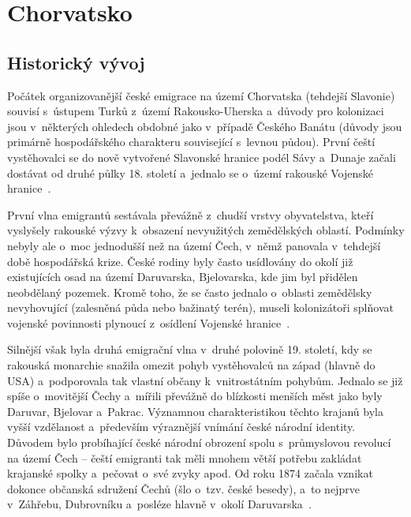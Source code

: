 \hypertarget{chorvatsko}{%
\section{Chorvatsko}\label{chorvatsko}}

\hypertarget{historickuxfd-vuxfdvoj-3}{%
\subsection*{Historický vývoj}\label{historickuxfd-vuxfdvoj-3}}

Počátek organizovanější české emigrace na území Chorvatska (tehdejší Slavonie) souvisí s~ústupem Turků z~území Rakousko-Uherska a~důvody pro kolonizaci jsou v~některých ohledech obdobné jako v~případě Českého Banátu (důvody jsou primárně hospodářského charakteru související s~levnou půdou). První čeští vystěhovalci se do nově vytvořené Slavonské hranice podél Sávy a~Dunaje začali dostávat od druhé půlky 18. století a~jednalo se o~území rakouské Vojenské hranice~\parencite{Preissova2020}.

První vlna emigrantů sestávala převážně z~chudší vrstvy obyvatelstva, kteří vyslyšely rakouské výzvy k~obsazení nevyužitých zemědělských oblastí. Podmínky nebyly ale o~moc jednodušší než na území Čech, v~němž panovala v~tehdejší době hospodářská krize. České rodiny byly často usídlovány do okolí již existujících osad na území Daruvarska, Bjelovarska, kde jim byl přidělen neobdělaný pozemek. Kromě toho, že se často jednalo o~oblasti zemědělsky nevyhovující (zalesněná půda nebo bažinatý terén), museli kolonizátoři splňovat vojenské povinnosti plynoucí z~osídlení Vojenské hranice~\parencite{Stranjik2017}.

Silnější však byla druhá emigrační vlna v~druhé polovině 19. století, kdy se rakouská monarchie snažila omezit pohyb vystěhovalců na západ (hlavně do USA) a~podporovala tak vlastní občany k~vnitrostátním pohybům. Jednalo se již spíše o~movitější Čechy a~mířili převážně do blízkosti menších měst jako byly Daruvar, Bjelovar a~Pakrac. Významnou charakteristikou těchto krajanů byla vyšší vzdělanost a~především výraznější vnímání české národní identity. Důvodem bylo probíhající české národní obrození spolu s~průmyslovou revolucí na území Čech -- čeští emigranti tak měli mnohem větší potřebu zakládat krajanské spolky a~pečovat o~své zvyky apod. Od roku 1874 začala vznikat dokonce občanská sdružení Čechů (šlo o~tzv. české besedy), a~to nejprve v~Záhřebu, Dubrovníku a~posléze hlavně v~okolí Daruvarska~\parencite{Stranjik2017}.

